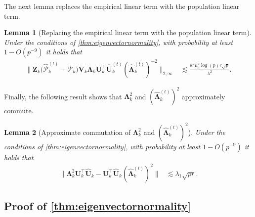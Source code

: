 \documentclass[10pt]{article}
\newcommand{\0}{{\mathbf{0}}}
\newcommand{\1}{{\mathbf{1}}}
\newcommand{\U}{{\mathbf{U}}}
\renewcommand{\t}{^{\top}}
\newcommand{\uhat}{\mathbf{\hat{U}}}
\newtheorem{lemma}{Lemma}
\renewcommand{\hat}{\widehat}
\renewcommand{\hat}{\widehat}
\begin{document}
\noindent 
The next lemma replaces the empirical linear term with the population linear term.

\begin{lemma}[Replacing the empirical linear term with the population linear term] \label{lem:empiricallinearreplacement}
Under the conditions of \cref{thm:eigenvectornormality}, with probability at least $1 - O(p^{-9})$ it holds that
\begin{align*}
    \bigg\| \mathbf{Z}_k \bigg( \mathcal{\hat P}_{k}^{(t)} - \mathcal{P}_k  \bigg) \mathbf{V}_k \mathbf{\Lambda}_k \U_k\t \uhat_k^{(t)}  (\mathbf{\hat \Lambda}_k^{(t)})^{-2} \bigg\|_{2,\infty} &\lesssim \frac{\kappa^2 \mu_0^2 \log(p) r \sqrt{p}}{\lambda^2}.
\end{align*}
\end{lemma}

\noindent 
Finally, the following result shows that $\mathbf{\Lambda}_k^2$ and $(\mathbf{\hat \Lambda}_k^{(t)})^2$ approximately commute.  
\begin{lemma}[Approximate commutation of $\mathbf{\Lambda}_k^2$ and $(\mathbf{\hat{\Lambda}}_k^{(t)})^2$] \label{lem:approximatecommute}
Under the conditions of \cref{thm:eigenvectornormality}, with probability at least $1 - O(p^{-9})$ it holds that
\begin{align*}
    \bigg\| \mathbf{\Lambda}_k^2 \U_k\t \uhat_k - \U_k\t \uhat_k (\mathbf{\hat{\Lambda}}_k^{(t)})^{2} \bigg\| &\lesssim \lambda_1 \sqrt{pr}.
\end{align*}
\end{lemma}



\subsection{Proof of \cref{thm:eigenvectornormality}}
\label{sec:eigenvectornormalityproof}
\end{document}
